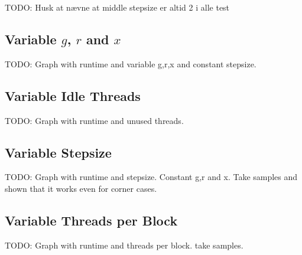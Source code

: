 
TODO: Husk at nævne at middle stepsize er altid 2 i alle test\\

\subsection{Variable $g$, $r$ and $x$}
TODO: Graph with runtime and variable g,r,x and constant stepsize.\\

\subsection{Variable Idle Threads}
TODO: Graph with runtime and unused threads.\\

\subsection{Variable Stepsize}
TODO: Graph with runtime and stepsize. Constant g,r and x. Take samples and shown that it works even for corner cases.\\

\subsection{Variable Threads per Block}
TODO: Graph with runtime and threads per block. take samples.
